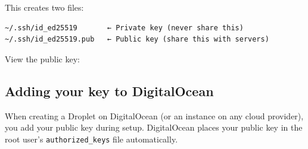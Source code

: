\begin{codebox}[short]

\begin{Shaded}
\begin{Highlighting}[]
  

\end{Highlighting}
\end{Shaded}

\end{codebox}

\noindent{}This creates two files:

\begin{outputbox}[short]
\begin{Verbatim}[fontsize=\codesize, breaklines, breakanywhere, breaksymbolleft={\tiny\textcolor{muted}{$\hookrightarrow$}}]
~/.ssh/id_ed25519       ← Private key (never share this)
~/.ssh/id_ed25519.pub   ← Public key (share this with servers)
\end{Verbatim}
\end{outputbox}

\noindent{}View the public key:

\begin{codebox}[short]

\begin{Shaded}
\begin{Highlighting}[]
\end{Highlighting}
\end{Shaded}

\end{codebox}

\subsection*{Adding your key to DigitalOcean}\label{21-system-setup:adding-your-key-to-digitalocean}

When creating a Droplet on DigitalOcean (or an instance on any cloud provider), you add your public key during setup. DigitalOcean places your public key in the root user's \texttt{authorized\_keys} file automatically.

